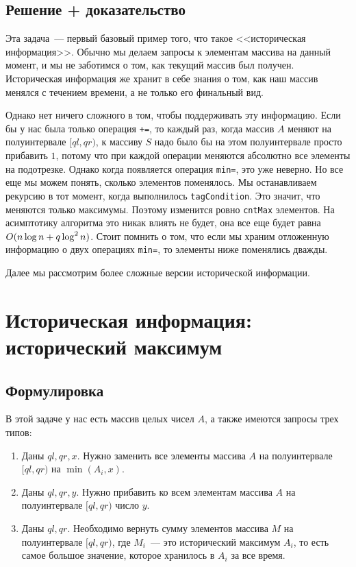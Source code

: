 \subsection{Решение + доказательство}

Эта задача~--- первый базовый пример того, что такое <<историческая информация>>. Обычно мы делаем запросы к элементам массива на данный момент, и мы не заботимся о том, как текущий массив был получен. Историческая информация же хранит в себе знания о том, как наш массив менялся с течением времени, а не только его финальный вид.

Однако нет ничего сложного в том, чтобы поддерживать эту информацию. Если бы у нас была только операция \verb^+=^, то каждый раз, когда массив $A$ меняют на полуинтервале $[ql, qr)$, к массиву $S$ надо было бы на этом полуинтервале просто прибавить $1$, потому что при каждой операции меняются абсолютно все элементы на подотрезке. Однако когда появляется операция \verb+min=+, это уже неверно. Но все еще мы можем понять, сколько элементов поменялось. Мы останавливаем рекурсию в тот момент, когда выполнилось \verb+tagCondition+. Это значит, что меняются только максимумы. Поэтому изменится ровно \verb+cntMax+ элементов. На асимптотику алгоритма это никак влиять не будет, она все еще будет равна $O(n \log n + q \log^2 n)$. Стоит помнить о том, что если мы храним отложенную информацию о двух операциях \verb+min=+, то элементы ниже поменялись дважды.

Далее мы рассмотрим более сложные версии исторической информации.








\cprotect \section{Историческая информация: исторический максимум}

\subsection{Формулировка}

В этой задаче у нас есть массив целых чисел $A$, а также имеются запросы трех типов:

\begin{enumerate}
    \item Даны $ql, qr, x$. Нужно заменить все элементы массива $A$ на полуинтервале $[ql, qr)$ на $\min(A_i, x)$.
    \item Даны $ql, qr, y$. Нужно прибавить ко всем элементам массива $A$ на полуинтервале $[ql, qr)$ число $y$.
    \item Даны $ql, qr$. Необходимо вернуть сумму элементов массива $M$ на полуинтервале $[ql, qr)$, где $M_i$~--- это исторический максимум $A_i$, то есть самое большое значение, которое хранилось в $A_i$ за все время.
\end{enumerate}

